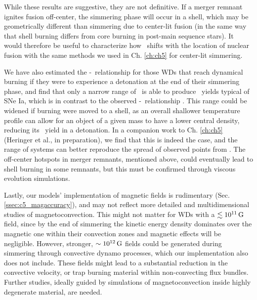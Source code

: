While these results are suggestive, they are not definitive.  If a merger remnant ignites fusion off-center, the simmering phase will occur in a shell, which may be geometrically different than simmering due to center-lit fusion (in the same way that shell burning differs from core burning in post-main sequence stars).  It would therefore be useful to characterize how \Mcrit\ shifts with the location of nuclear fusion with the same methods we used in Ch. \ref{ch:ch5} for center-lit simmering.

We have also estimated the \Mtot-\MNi\ relationship for those WDs that reach dynamical burning if they were to experience a detonation at the end of their simmering phase, and find that only a narrow range of \Mtot\ is able to produce \MNi\ yields typical of SNe Ia, which is in contrast to the observed \Mtot-\MNi\ relationship \citep{scalzrs14, chil+15}.  This range could be widened if burning were moved to a shell, as an overall shallower temperature profile can allow for an object of a given mass to have a lower central density, reducing its \Ni\ yield in a detonation.  In a companion work to Ch. \ref{ch:ch5} (Heringer et al., in preparation), we find that this is indeed the case, and the range of systems can better reproduce the spread of observed points from \cite{chil+15}.  The off-center hotspots in merger remnants, mentioned above, could eventually lead to shell burning in some remnants, but this must be confirmed through viscous evolution simulations.

Lastly, our models' implementation of magnetic fields is rudimentary (Sec. \ref{ssec:c5_magaccuracy}), and may not reflect more detailed and multidimensional studies of magnetoconvection.  This might not matter for WDs with a $\lesssim 10^{11}\,\mathrm{G}$ field, since by the end of simmering the kinetic energy density dominates over the magnetic one within their convection zones and magnetic effects will be negligible.  However, stronger, $\sim10^{12}\,\mathrm{G}$ fields could be generated during simmering through convective dynamo processes, which our implementation also does not include.  These fields might lead to a substantial reduction in the convective velocity, or trap burning material within non-convecting flux bundles.  Further studies, ideally guided by simulations of magnetoconvection inside highly degenerate material, are needed.


